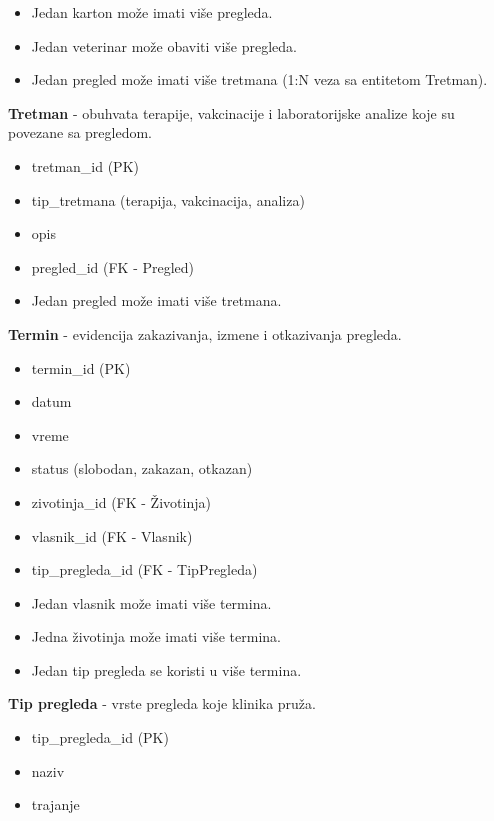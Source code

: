 \begin{itemize}{Veze:}
    \item Jedan karton može imati više pregleda.
    \item Jedan veterinar može obaviti više pregleda.
    \item Jedan pregled može imati više tretmana (1:N veza sa entitetom Tretman).
\end{itemize}

\indent\textbf{Tretman} - obuhvata terapije, vakcinacije i laboratorijske analize koje su povezane sa pregledom.
\begin{itemize}{Atributi:}
    \item tretman\_id (PK)
    \item tip\_tretmana (terapija, vakcinacija, analiza)
    \item opis
    \item pregled\_id (FK - Pregled)
\end{itemize}

\begin{itemize}{Veze:}
    \item Jedan pregled može imati više tretmana.
\end{itemize}

\indent\textbf{Termin} - evidencija zakazivanja, izmene i otkazivanja pregleda.
\begin{itemize}{Atributi:}
    \item termin\_id (PK)
    \item datum
    \item vreme
    \item status (slobodan, zakazan, otkazan)
    \item zivotinja\_id (FK - Životinja)
    \item vlasnik\_id (FK - Vlasnik)
    \item tip\_pregleda\_id (FK - TipPregleda)
\end{itemize}

\begin{itemize}{Veze:}
    \item Jedan vlasnik može imati više termina.
    \item Jedna životinja može imati više termina.
    \item Jedan tip pregleda se koristi u više termina.
\end{itemize}

\indent\textbf{Tip pregleda} - vrste pregleda koje klinika pruža.
\begin{itemize}{Atributi:}
    \item tip\_pregleda\_id (PK)
    \item naziv
    \item trajanje
\end{itemize}

